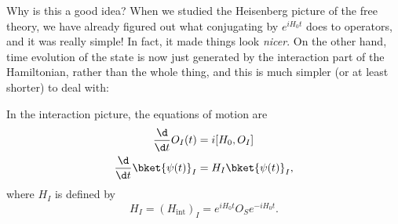 \documentclass[a4paper]{article}
\begin{document}
Why is this a good idea? When we studied the Heisenberg picture of the free theory, we have already figured out what conjugating by $e^{iH_0 t}$ does to operators, and it was really simple! In fact, it made things look \emph{nicer}. On the other hand, time evolution of the state is now just generated by the interaction part of the Hamiltonian, rather than the whole thing, and this is much simpler (or at least shorter) to deal with:

\begin{prop}
  In the interaction picture, the equations of motion are
  \begin{align*}
    \frac{\d}{\d t}O_I(t) &= i [H_0, O_I]\\
    \frac{\d}{\d t}\bket{\psi(t)}_I &= H_I\bket{\psi(t)}_I,
  \end{align*}
  where $H_I$ is defined by
  \[
    H_I = (H_{\mathrm{int}})_I = e^{iH_0 t} O_S e^{-iH_0 t}.
  \]
\end{prop}
\end{document}
